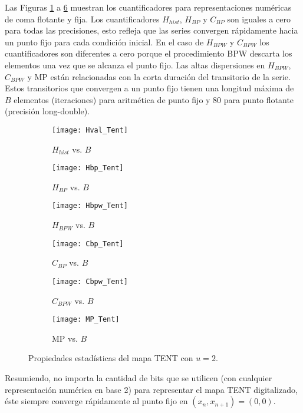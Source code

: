 Las Figuras \ref{fig:Hval_Tent} a \ref{fig:MP_Tent} muestran los cuantificadores para representaciones numéricas de coma flotante y fija.
Los cuantificadores $H_{hist}$, $H_{BP}$ y $C_{BP}$ son iguales a cero para todas las precisiones, esto refleja que las series convergen rápidamente hacia un punto fijo para cada condición inicial.
En el caso de $H_{BPW}$ y $C_{BPW}$ los cuantificadores son diferentes a cero porque el procedimiento BPW descarta los elementos una vez que se alcanza el punto fijo.
Las altas dispersiones en $H_{BPW}$, $C_{BPW}$ y MP están relacionadas con la corta duración del transitorio de la serie.
Estos transitorios que convergen a un punto fijo tienen una longitud máxima de $B$ elementos (iteraciones) para aritmética de punto fijo y $80$ para punto flotante (precisión long-double).
%
\begin{figure}[htpb]
	\centering
	\begin{subfigure}[b]{0.49\textwidth}
		\texttt{[image: Hval\_Tent]}
		\caption{$H_{hist}$ vs. $B$}
		\label{fig:Hval_Tent}
	\end{subfigure}
	\begin{subfigure}[b]{0.49\textwidth}
		\texttt{[image: Hbp\_Tent]}
		\caption{$H_{BP}$ vs. $B$}
		\label{fig:Hbp_Tent}
	\end{subfigure}
	\begin{subfigure}[b]{0.49\textwidth}
		\texttt{[image: Hbpw\_Tent]}
		\caption{$H_{BPW}$ vs. $B$}
		\label{fig:Hbpw_Tent}
	\end{subfigure}
	\begin{subfigure}[b]{0.49\textwidth}
		\texttt{[image: Cbp\_Tent]}
		\caption{$C_{BP}$ vs. $B$}
		\label{fig:Cbp_Tent}
	\end{subfigure}
	\begin{subfigure}[b]{0.49\textwidth}
		\texttt{[image: Cbpw\_Tent]}
		\caption{$C_{BPW}$ vs. $B$}
		\label{fig:Cbpw_Tent}
	\end{subfigure}
	\begin{subfigure}[b]{0.49\textwidth}
		\texttt{[image: MP\_Tent]}
		\caption{MP vs. $B$}
		\label{fig:MP_Tent}
	\end{subfigure}
	\caption{Propiedades estadísticas del mapa TENT con $u=2$.}
	\label{fig:TENT_QuantiB}
\end{figure}
%
Resumiendo, no importa la cantidad de bits que se utilicen (con cualquier representación numérica en base 2) para representar el mapa TENT digitalizado, éste siempre converge rápidamente al punto fijo en $(x_n, x_{n+1}) = (0, 0)$.

